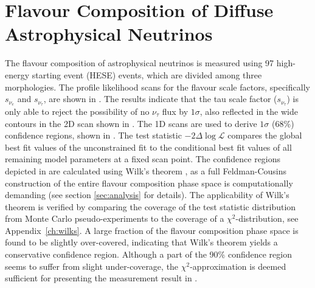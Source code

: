 \section{Flavour Composition of Diffuse Astrophysical Neutrinos}
\label{sec:flavour_results}
The flavour composition of astrophysical neutrinos is measured using 97 high-energy starting event (HESE) events, which are divided among three morphologies. The profile likelihood scans for the flavour scale factors, specifically $s_{\nu_{e}}$ and $s_{\nu_{\tau}}$, are shown in . The results indicate that the tau scale factor ($s_{\nu_{\tau}}$) is only able to reject the possibility of no $\nu_{\tau}$ flux by $1\sigma$, also reflected in the wide contours in the 2D scan shown in . The 1D scans are used to derive $1\sigma$ (68\%) confidence regions, shown in . The test statistic $-2\Delta \log \mathcal{L}$ compares the global best fit values of the unconstrained fit to the conditional best fit values of all remaining model parameters at a fixed scan point. The confidence regions depicted in  are calculated using Wilk's theorem  , as a full Feldman-Cousins construction of the entire flavour composition phase space is computationally demanding (see section \ref{sec:analysis} for details). The applicability of Wilk's theorem is verified by comparing the coverage of the test statistic distribution from Monte Carlo pseudo-experiments to the coverage of a $\chi^2$-distribution, see Appendix~\ref{ch:wilks}. A large fraction of the flavour composition phase space is found to be slightly over-covered, indicating that Wilk's theorem yields a conservative confidence region. Although a part of the 90\% confidence region seems to suffer from slight under-coverage, the $\chi^2$-approximation is deemed sufficient for presenting the measurement result in . 

